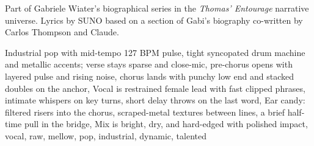 
\begin{notes}
Part of Gabriele Wiater's biographical series in the \emph{Thomas’ Entourage} narrative universe. Lyrics by SUNO based on a section of Gabi's biography co-written by Carlos Thompson and Claude.
\end{notes}
\begin{style}
Industrial pop with mid-tempo 127 BPM pulse, tight syncopated drum machine and metallic accents; verse stays sparse and close-mic, pre-chorus opens with layered pulse and rising noise, chorus lands with punchy low end and stacked doubles on the anchor, Vocal is restrained female lead with fast clipped phrases, intimate whispers on key turns, short delay throws on the last word, Ear candy: filtered risers into the chorus, scraped-metal textures between lines, a brief half-time pull in the bridge, Mix is bright, dry, and hard-edged with polished impact, vocal, raw, mellow, pop, industrial, dynamic, talented
\end{style}
